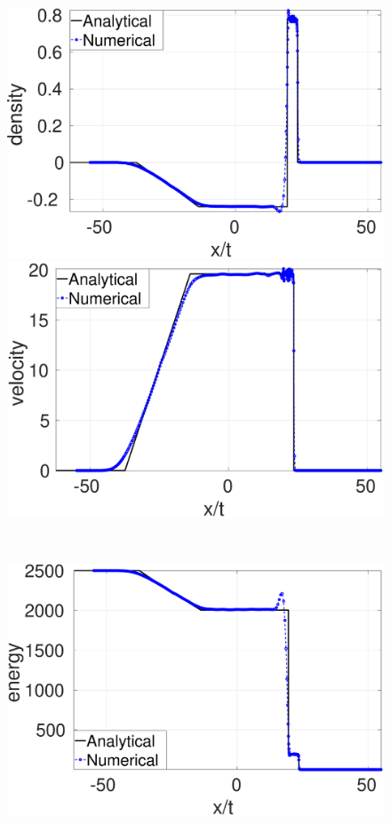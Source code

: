 \begin{figure}
    \centering
    \begin{minipage}{.495\textwidth}
        \centering
        \includegraphics[width=0.99 \textwidth]{Chapter-4/Figures/strong-blast/StrBlst-RCM-rho-Rp3}
    \end{minipage}%
    \begin{minipage}{.495 \textwidth}
        \centering
        \includegraphics[width=0.99 \textwidth]{Chapter-4/Figures/strong-blast/StrBlst-RCM-v-Rp3}
    \end{minipage}%
    \\
    \begin{minipage}{.495 \textwidth}
        \centering
        \includegraphics[width=0.99 \textwidth]{Chapter-4/Figures/strong-blast/StrBlst-RCM-e-Rp3}

\end{minipage}
\end{figure}
